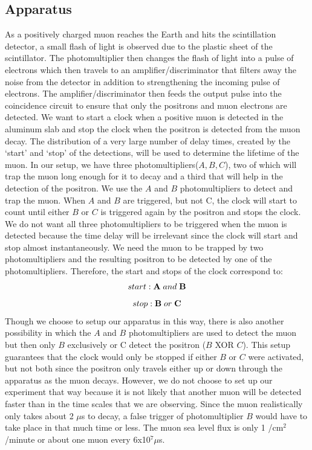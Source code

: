 \subsection{Apparatus}
\indent  \indent As a positively charged muon reaches the Earth and hits the scintillation detector, a small flash of light is observed due to the plastic sheet of the scintillator. The photomultiplier then changes the flash of light into a pulse of electrons which then travels to an amplifier/discriminator that filters away the noise from the detector in addition to strengthening the incoming pulse of electrons. The amplifier/discriminator then feeds the output pulse into the coincidence circuit to ensure that only the positrons and muon electrons are detected. 
\newline \indent We want to start a clock when a positive muon is detected in the aluminum slab and stop the clock when the positron is detected from the muon decay. The distribution of a very large number of delay times, created by the `start' and `stop' of the detections, will be used to determine the lifetime of the muon. 
\newline \indent In our setup, we have three photomultipliers($A, B, C$), two of which will trap the muon long enough for it to decay and a third that will help in the detection of the positron. We use the $A$ and $B$ photomultipliers to detect and trap the muon. When $A$ and $B$ are triggered, but not C, the clock will start to count until either $B$ or $C$ is triggered again by the positron and stops the clock. We do not want all three photomultipliers to be triggered when the muon is detected because the time delay will be irrelevant since the clock will start and stop almost instantaneously. We need the muon to be trapped by two photomultipliers and the resulting positron to be detected by one of the photomultipliers. Therefore, the start and stops of the clock correspond to:
\begin{equation} start: \textbf A\;and\; \textbf B \end{equation}
\begin{equation} stop: \textbf B\; or\; \textbf C \end{equation}
Though we choose to setup our apparatus in this way, there is also another possibility in which the $A$ and $B$ photomultipliers are used to detect the muon but then only $B$ exclusively or C detect the positron ($B$ XOR $C$). This setup guarantees that the clock would only be stopped if either $B$ or $C$ were activated, but not both since the positron only travels either up or down through the apparatus as the muon decays. However, we do not choose to set up our experiment that way because it is not likely that another muon will be detected faster than in the time scales that we are observing. Since the muon realistically only takes about 2 $\mu$s to decay, a false trigger of photomultiplier $B$ would have to take place in that much time or less. The muon sea level flux is only 1 /cm$^2$/minute or about one muon every 6x10$^7\mu$s.
